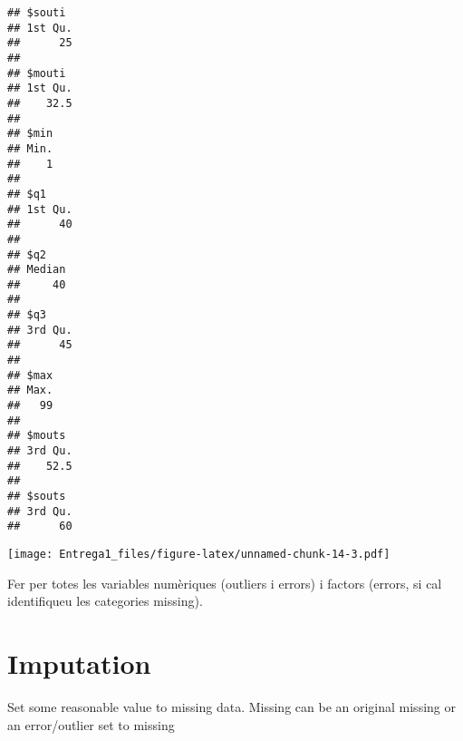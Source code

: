 \documentclass[12pt,]{article}
\newenvironment{Shaded}{\begin{snugshade}}{\end{snugshade}}
\newcommand{\CommentTok}[1]{\textcolor[rgb]{0.56,0.35,0.01}{\textit{#1}}}
\newcommand{\DataTypeTok}[1]{\textcolor[rgb]{0.13,0.29,0.53}{#1}}
\newcommand{\DecValTok}[1]{\textcolor[rgb]{0.00,0.00,0.81}{#1}}
\newcommand{\KeywordTok}[1]{\textcolor[rgb]{0.13,0.29,0.53}{\textbf{#1}}}
\newcommand{\NormalTok}[1]{#1}
\newcommand{\OperatorTok}[1]{\textcolor[rgb]{0.81,0.36,0.00}{\textbf{#1}}}
\newcommand{\StringTok}[1]{\textcolor[rgb]{0.31,0.60,0.02}{#1}}
\begin{document}
\begin{Shaded}
\end{Shaded}

\begin{verbatim}
## $souti
## 1st Qu. 
##      25 
## 
## $mouti
## 1st Qu. 
##    32.5 
## 
## $min
## Min. 
##    1 
## 
## $q1
## 1st Qu. 
##      40 
## 
## $q2
## Median 
##     40 
## 
## $q3
## 3rd Qu. 
##      45 
## 
## $max
## Max. 
##   99 
## 
## $mouts
## 3rd Qu. 
##    52.5 
## 
## $souts
## 3rd Qu. 
##      60
\end{verbatim}

\begin{Shaded}
\end{Shaded}

\texttt{[image: Entrega1\_files/figure-latex/unnamed-chunk-14-3.pdf]}

Fer per totes les variables numèriques (outliers i errors) i factors
(errors, si cal identifiqueu les categories missing).

\hypertarget{imputation}{%
\section{Imputation}\label{imputation}}

Set some reasonable value to missing data. Missing can be an original
missing or an error/outlier set to missing
\end{document}
